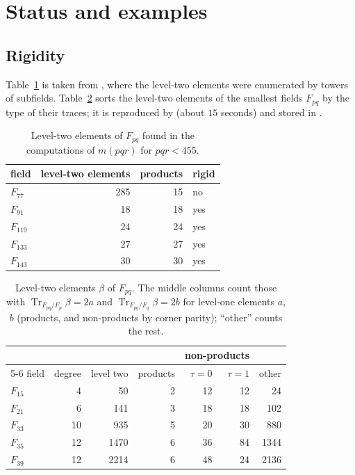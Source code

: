 \documentclass[11pt]{amsart}
\DeclareMathOperator{\Tr}{Tr}
\theoremstyle{plain}
\theoremstyle{definition}
\begin{document}
\section{Status and examples}\label{sec:status}

\subsection{Rigidity}\label{sec:rigidity}
Table~\ref{tab:rigid} is taken from , where
the level-two elements were enumerated by towers of subfields. Table~\ref{tab:census} sorts the
level-two elements of the smallest fields $F_{pq}$ by the type of their traces; it is reproduced
by  (about $15$ seconds) and stored in
.

\begin{table}[ht]
\centering
\begin{tabular}{lrrl}
\toprule
field & level-two elements & products & rigid \\
\midrule
$F_{77}$  & 285 & 15 & no \\
$F_{91}$  & 18  & 18 & yes \\
$F_{119}$ & 24  & 24 & yes \\
$F_{133}$ & 27  & 27 & yes \\
$F_{143}$ & 30  & 30 & yes \\
\bottomrule
\end{tabular}
\caption{Level-two elements of $F_{pq}$ found in the computations of $m(pqr)$ for $pqr < 455$.}
\label{tab:rigid}
\end{table}

\begin{table}[ht]
\centering
\begin{tabular}{lrrrrrr}
\toprule
 & & & & \multicolumn{2}{c}{non-products} & \\
\cmidrule(lr){5-6}
field & degree & level two & products & $\tau = 0$ & $\tau = 1$ & other \\
\midrule
$F_{15}$ & 4  & 50   & 2 & 12 & 12 & 24 \\
$F_{21}$ & 6  & 141  & 3 & 18 & 18 & 102 \\
$F_{33}$ & 10 & 935  & 5 & 20 & 30 & 880 \\
$F_{35}$ & 12 & 1470 & 6 & 36 & 84 & 1344 \\
$F_{39}$ & 12 & 2214 & 6 & 48 & 24 & 2136 \\
\bottomrule
\end{tabular}
\caption{Level-two elements $\beta$ of $F_{pq}$. The middle columns count those with
$\Tr_{F_{pq}/F_p}\beta = 2a$ and $\Tr_{F_{pq}/F_q}\beta = 2b$ for level-one elements $a$, $b$
(products, and non-products by corner parity); ``other'' counts the rest.}
\label{tab:census}
\end{table}
\end{document}
